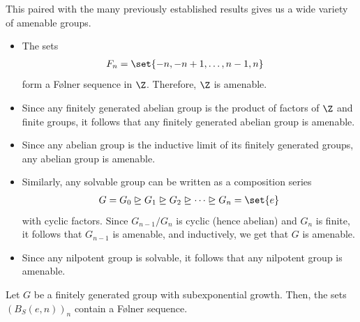 \documentclass[10pt]{mypackage}
\begin{document}
This paired with the many previously established results gives us a wide variety of amenable groups.
\begin{itemize}
  \item The sets
    \begin{align*}
      F_n &= \set{-n,-n+1,\dots,n-1,n}
    \end{align*}
    form a Følner sequence in $\Z$. Therefore, $\Z$ is amenable.
  \item Since any finitely generated abelian group is the product of factors of $\Z$ and finite groups, it follows that any finitely generated abelian group is amenable.
  \item Since any abelian group is the inductive limit of its finitely generated groups, any abelian group is amenable.
  \item Similarly, any solvable group can be written as a composition series
    \begin{align*}
      G = G_0\trianglerighteq G_1\trianglerighteq G_2\trianglerighteq\cdots\trianglerighteq G_n = \set{e}
    \end{align*}
    with cyclic factors. Since $G_{n-1}/G_n$ is cyclic (hence abelian) and $G_n$ is finite, it follows that $G_{n-1}$ is amenable, and inductively, we get that $G$ is amenable.
  \item Since any nilpotent group is solvable, it follows that any nilpotent group is amenable.
\end{itemize}
\begin{proposition}
  Let $G$ be a finitely generated group with subexponential growth. Then, the sets $\left( B_S\left( e,n \right) \right)_{n}$ contain a Følner sequence.
\end{proposition}
\end{document}
